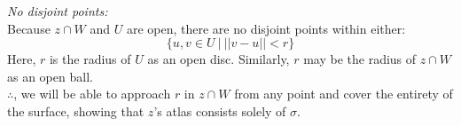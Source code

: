 \documentclass[12pt]{article}
\begin{document}
\emph{No disjoint points:}\\
\indent
Because $z \cap W$ and $U$ are open, there are no disjoint points within either:
$$
\lbrace u,v \in U \ | \ ||v-u|| < r \rbrace
$$
\indent
Here, $r$ is the radius of $U$ as an open disc. Similarly, $r$ may be the radius of $z \cap W$ as an open ball.\\

$\therefore$, we will be able to approach $r$ in $z \cap W$ from any point and cover the entirety of the surface, showing that $z$'s atlas consists solely of $\sigma$.
\end{document}
